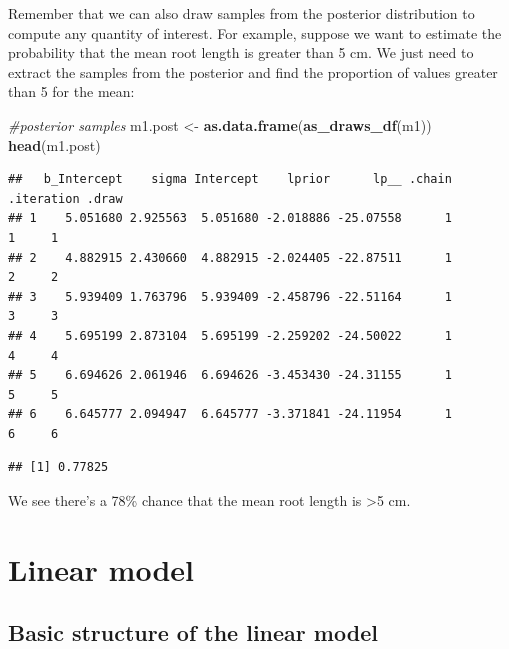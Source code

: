 \documentclass[
]{book}
\newenvironment{Shaded}{\begin{snugshade}}{\end{snugshade}}
\newcommand{\CommentTok}[1]{\textcolor[rgb]{0.56,0.35,0.01}{\textit{#1}}}
\newcommand{\DecValTok}[1]{\textcolor[rgb]{0.00,0.00,0.81}{#1}}
\newcommand{\FunctionTok}[1]{\textcolor[rgb]{0.13,0.29,0.53}{\textbf{#1}}}
\newcommand{\NormalTok}[1]{#1}
\newcommand{\OtherTok}[1]{\textcolor[rgb]{0.56,0.35,0.01}{#1}}
\newcommand{\SpecialCharTok}[1]{\textcolor[rgb]{0.81,0.36,0.00}{\textbf{#1}}}
\begin{document}
Remember that we can also draw samples from the posterior distribution to compute any quantity of interest. For example, suppose we want to estimate the probability that the mean root length is greater than 5 cm. We just need to extract the samples from the posterior and find the proportion of values greater than 5 for the mean:

\begin{Shaded}
\begin{Highlighting}[]
\CommentTok{\#posterior samples}
\NormalTok{m1.post }\OtherTok{\textless{}{-}} \FunctionTok{as.data.frame}\NormalTok{(}\FunctionTok{as\_draws\_df}\NormalTok{(m1))}
\FunctionTok{head}\NormalTok{(m1.post)}
\end{Highlighting}
\end{Shaded}

\begin{verbatim}
##   b_Intercept    sigma Intercept    lprior      lp__ .chain .iteration .draw
## 1    5.051680 2.925563  5.051680 -2.018886 -25.07558      1          1     1
## 2    4.882915 2.430660  4.882915 -2.024405 -22.87511      1          2     2
## 3    5.939409 1.763796  5.939409 -2.458796 -22.51164      1          3     3
## 4    5.695199 2.873104  5.695199 -2.259202 -24.50022      1          4     4
## 5    6.694626 2.061946  6.694626 -3.453430 -24.31155      1          5     5
## 6    6.645777 2.094947  6.645777 -3.371841 -24.11954      1          6     6
\end{verbatim}

\begin{Shaded}
\end{Shaded}

\begin{verbatim}
## [1] 0.77825
\end{verbatim}

We see there's a 78\% chance that the mean root length is \textgreater5 cm.

\section{Linear model}\label{linear-model}

\subsection{Basic structure of the linear model}\label{basic-structure-of-the-linear-model}
\end{document}
